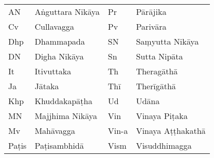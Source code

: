 \clearpage
{}
\bigskip


\bigskip

\begin{tabular}{@{}ll ll@{}}
  AN & Aṅguttara Nikāya & Pr & Pārājika\\
  Cv & Cullavagga &       Pv & Parivāra\\
  Dhp & Dhammapada &      SN & Saṃyutta Nikāya \\
  DN & Digha Nikāya  &    Sn & Sutta Nipāta\\
  It & Itivuttaka &       Th & Theragāthā \\
  Ja & Jātaka &           Thī & Therīgāthā\\
  Khp & Khuddakapāṭha &   Ud & Udāna\\
  MN & Majjhima Nikāya &  Vin & Vinaya Piṭaka\\
  Mv & Mahāvagga &        Vin-a & Vinaya Aṭṭhakathā\\
  Paṭis & Paṭisambhidā &  Vism & Visuddhimagga\\
\end{tabular}

%
%

